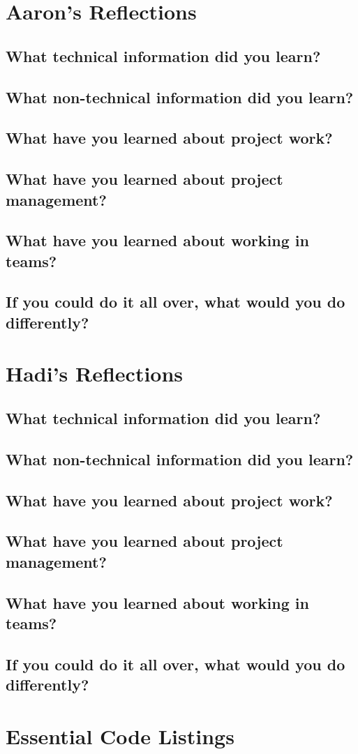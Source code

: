 \documentclass[onecolumn, draftclsnofoot,10pt, compsoc]{report}
\begin{document}
\section{Aaron's Reflections}
\subsection{What technical information did you learn?}
\subsection{What non-technical information did you learn?}
\subsection{What have you learned about project work?}
\subsection{What have you learned about project management?}
\subsection{What have you learned about working in teams?}
\subsection{If you could do it all over, what would you do differently?}
\section{Hadi's Reflections}
\subsection{What technical information did you learn?}
\subsection{What non-technical information did you learn?}
\subsection{What have you learned about project work?}
\subsection{What have you learned about project management?}
\subsection{What have you learned about working in teams?}
\subsection{If you could do it all over, what would you do differently?}

\appendix
\minitoc
\section{Essential Code Listings}
\end{document}
